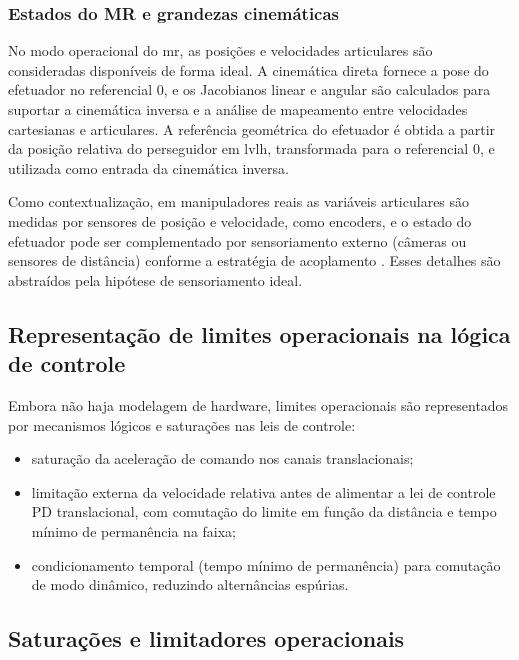 \subsubsection{Estados do MR e grandezas cinemáticas}
\label{subsubsec:sensoriamento_mr_cinematica}

No modo operacional do \gls{mr}, as posições e velocidades articulares são consideradas disponíveis de forma ideal.
A cinemática direta fornece a pose do efetuador no referencial 0, e os Jacobianos linear e angular são calculados para suportar a cinemática inversa e a análise de mapeamento entre velocidades cartesianas e articulares.
A referência geométrica do efetuador é obtida a partir da posição relativa do perseguidor em \gls{lvlh}, transformada para o referencial 0, e utilizada como entrada da cinemática inversa.

Como contextualização, em manipuladores reais as variáveis articulares são medidas por sensores de posição e velocidade, como encoders, e o estado do efetuador pode ser complementado por sensoriamento externo (câmeras ou sensores de distância) conforme a estratégia de acoplamento \cite{fehse2003,wertz2011sme_smad}. Esses detalhes são abstraídos pela hipótese de sensoriamento ideal.

\subsection{Representação de limites operacionais na lógica de controle}
\label{subsec:limites_operacionais_logica}

Embora não haja modelagem de hardware, limites operacionais são representados por mecanismos lógicos e saturações nas leis de controle:

\begin{itemize}
\item saturação da aceleração de comando nos canais translacionais;
\item limitação externa da velocidade relativa antes de alimentar a lei de controle PD translacional, com comutação do limite em função da distância e tempo mínimo de permanência na faixa;
\item condicionamento temporal (tempo mínimo de permanência) para comutação de modo dinâmico, reduzindo alternâncias espúrias.
\end{itemize}

\subsection{Saturações e limitadores operacionais}
\label{subsec:saturacoes_limitadores_operacionais}

